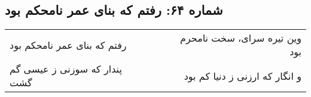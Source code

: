 \begin{center}
\section*{شماره ۶۴: رفتم که بنای عمر نامحکم بود}
\label{sec:064}
\begin{longtable}{l p{0.5cm} r}
رفتم که بنای عمر نامحکم بود
&&
وین تیره سرای، سخت نامحرم بود
\\
پندار که سوزنی ز عیسی گم گشت
&&
و انگار که ارزنی ز دنیا کم بود
\\
\end{longtable}
\end{center}
